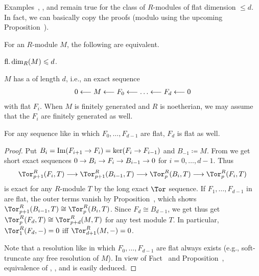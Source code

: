 \documentclass[a4paper,parskip=half,numbers=enddot, DIV=12]{scrreprt}
\renewcommand{\leq}{\leqslant}
\begin{document}
\begin{rem*}
	Examples~, , and  remain true for the class of $R$-modules of flat dimension $\leq d$. In fact, we can basically copy the proofs (modulo using the upcoming Proposition~).
\end{rem*}
\begin{prop}
	For an $R$-module $M$, the following are equivalent.
	\begin{alphanumerate}
		\item $\fdim_R(M)\leq d$.
		\item $M$ has a  of length $d$, i.e., an exact sequence
		\begin{align}\lbl{eq:flatResolution}
			0\lmorphism M\lmorphism F_0\lmorphism \ldots\lmorphism F_d\lmorphism 0
		\end{align}
		with flat $F_i$. When $M$ is finitely generated and $R$ is noetherian, we may assume that the $F_i$ are finitely generated as well.
		\item For any sequence like  in which $F_0,\ldots,F_{d-1}$ are flat, $F_d$ is flat as well.
	\end{alphanumerate}
\end{prop}
\begin{proof}
	Put $B_i=\Im(F_{i+1}\morphism F_i)=\ker(F_i\morphism F_{i-1})$ and $B_{-1}\coloneqq M$. From  we get short exact sequences $0\morphism B_i\morphism F_i\morphism B_{i-1}\morphism 0$ for $i=0,\ldots,d-1$. Thus
	\begin{align*}
		\Tor_{p+1}^R(F_i,T)\morphism \Tor_{p+1}^R(B_{i-1},T)\morphism \Tor_p^R(B_i,T)\morphism\Tor_p^R(F_i,T)
	\end{align*}
	is exact for any $R$-module $T$ by the long exact $\Tor$ sequence. If $F_1,\ldots,F_{d-1}$ in  are flat, the outer terms vanish by Proposition~, which shows $\Tor_{p+1}^R(B_{i-1},T)\cong \Tor_p^R(B_i,T)$. Since $F_d\cong B_{d-1}$, we get thus get $\Tor_p^R(F_d,T)\cong \Tor_{p+d}^R(M,T)$ for any test module $T$. In particular, $\Tor_1^R(F_d,-)=0$ iff $\Tor_{d+1}^R(M,-)=0$.
	
	Note that a resolution like  in which $F_0,\ldots,F_{d-1}$ are flat always exists (e.g., soft-truncate any free resolution of $M$). In view of Fact~ and Proposition~, equivalence of , , and  is easily deduced.
\end{proof}
\end{document}
